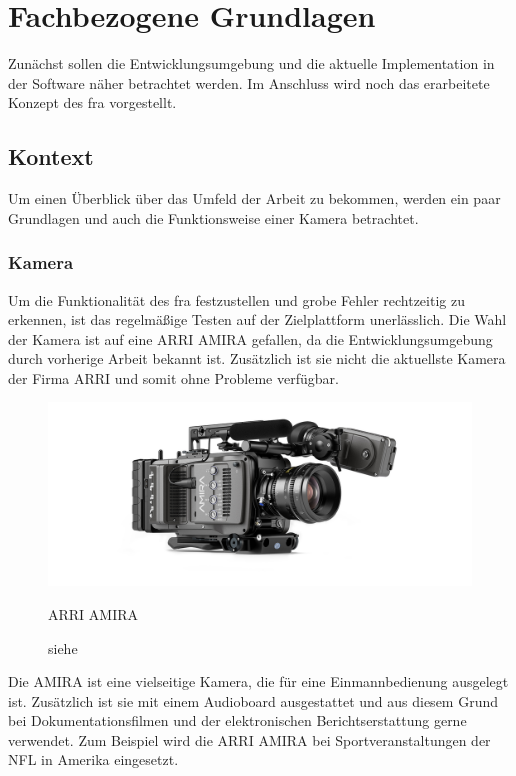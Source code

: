 \chapter{Fachbezogene Grundlagen} \label{sec:fachgrund}
Zunächst sollen die Entwicklungsumgebung und die aktuelle Implementation in der Software näher betrachtet werden. Im Anschluss wird noch das erarbeitete Konzept des \ac{fra} vorgestellt.

\section{Kontext}
Um einen Überblick über das Umfeld der Arbeit zu bekommen, werden ein paar Grundlagen und auch die Funktionsweise einer Kamera betrachtet. 

\subsection{Kamera}
Um die Funktionalität des \ac{fra} festzustellen und grobe Fehler rechtzeitig zu erkennen, ist das regelmäßige Testen auf der Zielplattform unerlässlich. 
Die Wahl der Kamera ist auf eine \ac{ARRI} AMIRA gefallen, da die Entwicklungsumgebung durch vorherige Arbeit bekannt ist. Zusätzlich ist sie nicht die aktuellste Kamera der Firma \ac{ARRI} und somit ohne Probleme verfügbar.

\begin{figure}[!hbtp]
	\centering
	\includegraphics[width = 0.7\linewidth]{pictures/amira-product-image-data.jpg}
	\hspace*{0\textwidth}
	\caption{ARRI AMIRA}
	\caption*{siehe \cite{arriamira_bild}}
	\label{fig:amira}
\end{figure}  

Die AMIRA ist eine vielseitige Kamera, die für eine Einmannbedienung ausgelegt ist.
Zusätzlich ist sie mit einem Audioboard ausgestattet und aus diesem Grund bei Dokumentationsfilmen und der elektronischen Berichtserstattung gerne verwendet. Zum Beispiel wird die \ac{ARRI} AMIRA bei Sportveranstaltungen der NFL in Amerika eingesetzt. \cite{arrinewsamira} 

